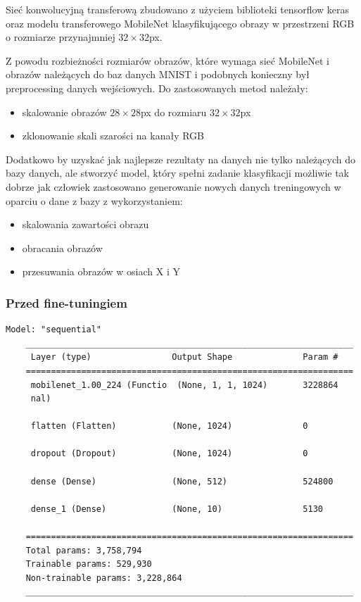 \documentclass{article}
\begin{document}
Sieć konwolucyjną transferową zbudowano z użyciem biblioteki tensorflow 
keras oraz modelu transferowego MobileNet klasyfikującego obrazy w 
przestrzeni RGB o rozmiarze przynajmniej $32\times32$px.

Z powodu rozbieżności rozmiarów obrazów, które wymaga sieć MobileNet 
i obrazów należących do baz danych MNIST i podobnych konieczny był 
preprocessing danych wejściowych. Do zastosowanych metod należały:

\begin{itemize}
\item skalowanie obrazów $28\times28$px do rozmiaru $32\times32$px
\item zklonowanie skali szarości na kanały RGB 
\end{itemize}

Dodatkowo by uzyskać jak najlepsze rezultaty na danych nie tylko 
należących do bazy danych, ale stworzyć model, który spełni zadanie 
klasyfikacji możliwie tak dobrze jak człowiek zastosowano 
generowanie nowych danych treningowych w oparciu o dane z bazy z wykorzystaniem:

\begin{itemize}
\item skalowania zawartości obrazu
\item obracania obrazów
\item przesuwania obrazów w osiach X i Y
\end{itemize}

\subsubsection{Przed fine-tuningiem}

\begin{lstlisting}[style=siec]
    Model: "sequential"
    _________________________________________________________________
     Layer (type)                Output Shape              Param #
    =================================================================
     mobilenet_1.00_224 (Functio  (None, 1, 1, 1024)       3228864
     nal)

     flatten (Flatten)           (None, 1024)              0

     dropout (Dropout)           (None, 1024)              0

     dense (Dense)               (None, 512)               524800

     dense_1 (Dense)             (None, 10)                5130

    =================================================================
    Total params: 3,758,794
    Trainable params: 529,930
    Non-trainable params: 3,228,864
    _________________________________________________________________
\end{lstlisting}
\end{document}
